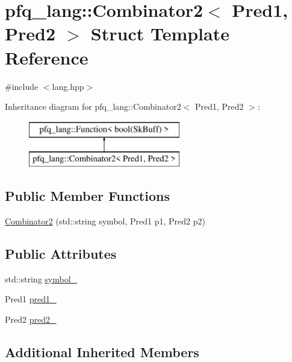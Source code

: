 \hypertarget{structpfq__lang_1_1Combinator2}{\section{pfq\+\_\+lang\+:\+:Combinator2$<$ Pred1, Pred2 $>$ Struct Template Reference}
\label{structpfq__lang_1_1Combinator2}
}


{\ttfamily \#include $<$lang.\+hpp$>$}

Inheritance diagram for pfq\+\_\+lang\+:\+:Combinator2$<$ Pred1, Pred2 $>$\+:\begin{figure}[H]
\begin{center}
\leavevmode
\includegraphics[height=2.000000cm]{structpfq__lang_1_1Combinator2}
\end{center}
\end{figure}
\subsection*{Public Member Functions}
\begin{DoxyCompactItemize}
\item 
\hyperlink{structpfq__lang_1_1Combinator2_a52efcf321388d53ba41d28b6caec515d}{Combinator2} (std\+::string symbol, Pred1 p1, Pred2 p2)
\end{DoxyCompactItemize}
\subsection*{Public Attributes}
\begin{DoxyCompactItemize}
\item 
std\+::string \hyperlink{structpfq__lang_1_1Combinator2_a0fb906403163d6c600b7b86ff915900b}{symbol\+\_\+}
\item 
Pred1 \hyperlink{structpfq__lang_1_1Combinator2_a65f2f5cef67e0525a504529bdb264ab3}{pred1\+\_\+}
\item 
Pred2 \hyperlink{structpfq__lang_1_1Combinator2_a32669787a9dc32693db9813e1e5b7c0d}{pred2\+\_\+}
\end{DoxyCompactItemize}
\subsection*{Additional Inherited Members}


